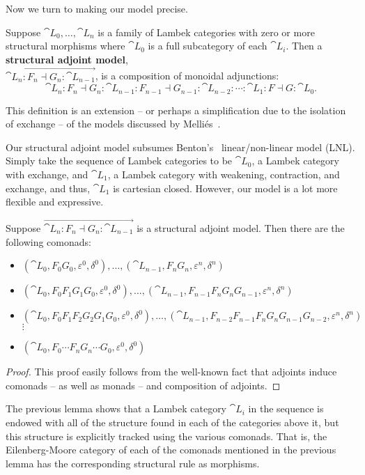 Now we turn to making our model precise.
\begin{definition}
  \label{def:model}  
  Suppose $\cat{L}_0, \ldots, \cat{L}_n$ is a family of Lambek
  categories with zero or more structural morphisms where $\cat{L}_0$
  is a full subcategory of each $\cat{L}_{i}$.  Then a \textbf{structural
    adjoint model}, \\ $\overrightarrow{\cat{L}_n : F_n \dashv G_n : \cat{L}_{n-1}}$, is a composition of monoidal adjunctions:
  \[ \cat{L}_n : F_n \dashv G_n : \cat{L}_{n-1} : F_{n-1} \dashv G_{n-1} : \cat{L}_{n-2} : \cdots : \cat{L}_1 : F \dashv G : \cat{L}_0. \]
\end{definition}
This definition is an extension -- or perhaps a simplification due to
the isolation of exchange -- of the models discussed by
Melli\'es~\cite{MELLIES2004202}.

Our structural adjoint model subsumes Benton's~\cite{Benton:1994}
linear/non-linear model (LNL).  Simply take the sequence of Lambek
categories to be $\cat{L}_0$, a Lambek category with exchange, and
$\cat{L}_1$, a Lambek category with weakening, contraction, and
exchange, and thus, $\cat{L}_1$ is cartesian closed.  However, our
model is a lot more flexible and expressive.

\begin{lemma}
  \label{lemma:comonads_in_a_structural_adjoint_model}
  Suppose $\overrightarrow{\cat{L}_n : F_n \dashv G_n : \cat{L}_{n-1}}$ is a structural adjoint model.  Then
  there are the following comonads:  
  \begin{itemize}
  \item $(\cat{L}_0, F_0G_0, \varepsilon^0, \delta^0), \ldots, (\cat{L}_{n-1}, F_nG_n, \varepsilon^{n}, \delta^{n})$
  \item $(\cat{L}_0, F_0F_1G_1G_0, \varepsilon^0, \delta^0), \ldots, (\cat{L}_{n-1}, F_{n-1}F_nG_nG_{n-1}, \varepsilon^{n}, \delta^{n})$
  \item $(\cat{L}_0, F_0F_1F_2G_2G_1G_0, \varepsilon^0, \delta^0), \ldots, (\cat{L}_{n-1}, F_{n-2}F_{n-1}F_nG_nG_{n-1}G_{n-2}, \varepsilon^{n}, \delta^{n})$\\
    $\vdots$
  \item $(\cat{L}_0, F_0 \cdots F_nG_n \cdots G_0, \varepsilon^0, \delta^0)$
  \end{itemize} 
\end{lemma}
\begin{proof}
  This proof easily follows from the well-known fact that adjoints
  induce comonads -- as well as monads -- and composition of adjoints.
\end{proof}
The previous lemma shows that a Lambek category $\cat{L}_i$ in the
sequence is endowed with all of the structure found in each of the
categories above it, but this structure is explicitly tracked using
the various comonads.  That is, the Eilenberg-Moore category of each of the
comonads mentioned in the previous lemma has the corresponding
structural rule as morphisms.

